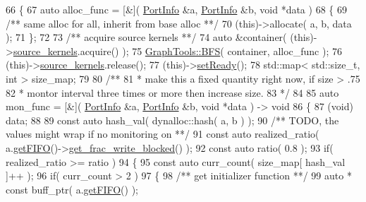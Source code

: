 \begin{DoxyCode}
66 \{
67    \textcolor{keyword}{auto} alloc\_func = [&]( \hyperlink{struct_port_info}{PortInfo} &a, \hyperlink{struct_port_info}{PortInfo} &b, \textcolor{keywordtype}{void} *data )
68    \{\textcolor{comment}{}
69 \textcolor{comment}{      /** same alloc for all, inherit from base alloc **/}
70       (\textcolor{keyword}{this})->allocate( a, b, data );
71    \};
72 \textcolor{comment}{}
73 \textcolor{comment}{   /** acquire source kernels **/}
74    \textcolor{keyword}{auto} &container( (\textcolor{keyword}{this})->\hyperlink{class_allocate_a93e612d7ea7eb686fc88b5dee7a1407b}{source\_kernels}.acquire() );
75    \hyperlink{class_graph_tools_ade51007699cbd681c1a37946609c46ee}{GraphTools::BFS}( container, alloc\_func );
76    (\textcolor{keyword}{this})->\hyperlink{class_allocate_a93e612d7ea7eb686fc88b5dee7a1407b}{source\_kernels}.release();
77    (\textcolor{keyword}{this})->\hyperlink{class_allocate_a4cf36bb704e43f5736a0e736d9e1a81b}{setReady}();
78    std::map< std::size\_t, int > size\_map;
79 \textcolor{comment}{}
80 \textcolor{comment}{   /**}
81 \textcolor{comment}{    * make this a fixed quantity right now, if size > .75%
82 \textcolor{comment}{    * montor interval three times or more then increase size.}
83 \textcolor{comment}{    */}
84 
85    \textcolor{keyword}{auto} mon\_func = [&]( \hyperlink{struct_port_info}{PortInfo} &a, \hyperlink{struct_port_info}{PortInfo} &b, \textcolor{keywordtype}{void} *data ) -> \textcolor{keywordtype}{void}
86    \{
87       (void) data;
88 
89       \textcolor{keyword}{const} \textcolor{keyword}{auto} hash\_val( dynalloc::hash( a, b ) );\textcolor{comment}{}
90 \textcolor{comment}{      /** TODO, the values might wrap if no monitoring on **/}
91       \textcolor{keyword}{const} \textcolor{keyword}{auto} realized\_ratio( a.\hyperlink{struct_port_info_a483d162fbe356e07381c6c5cfccb4f48}{getFIFO}()->\hyperlink{class_f_i_f_o_a4d44784c43a4026508e85982eb3174c7}{get\_frac\_write\_blocked}() );
92       \textcolor{keyword}{const} \textcolor{keyword}{auto} ratio( 0.8 );
93       \textcolor{keywordflow}{if}( realized\_ratio >= ratio )
94       \{
95          \textcolor{keyword}{const} \textcolor{keyword}{auto} curr\_count( size\_map[ hash\_val ]++ );
96          \textcolor{keywordflow}{if}( curr\_count  > 2 )
97          \{\textcolor{comment}{}
98 \textcolor{comment}{            /** get initializer function **/}
99             \textcolor{keyword}{auto} * \textcolor{keyword}{const} buff\_ptr( a.\hyperlink{struct_port_info_a483d162fbe356e07381c6c5cfccb4f48}{getFIFO}() );
}
\end{DoxyCode}
